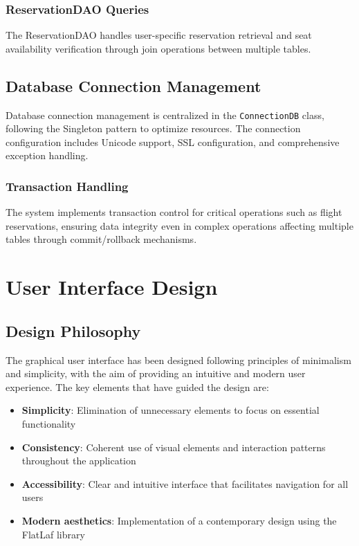 \documentclass[conference]{IEEEtran}
\begin{document}
    \subsubsection{ReservationDAO Queries}
    The ReservationDAO handles user-specific reservation retrieval and seat availability verification through join operations between multiple tables.

    \subsection{Database Connection Management}
    Database connection management is centralized in the \texttt{ConnectionDB} class, following the Singleton pattern to optimize resources. The connection configuration includes Unicode support, SSL configuration, and comprehensive exception handling.

    \subsubsection{Transaction Handling}
    The system implements transaction control for critical operations such as flight reservations, ensuring data integrity even in complex operations affecting multiple tables through commit/rollback mechanisms.


    \section{User Interface Design}

    \subsection{Design Philosophy}
    The graphical user interface has been designed following principles of minimalism and simplicity, with the aim of providing an intuitive and modern user experience. The key elements that have guided the design are:

    \begin{itemize}
        \item \textbf{Simplicity}: Elimination of unnecessary elements to focus on essential functionality
        \item \textbf{Consistency}: Coherent use of visual elements and interaction patterns throughout the application
        \item \textbf{Accessibility}: Clear and intuitive interface that facilitates navigation for all users
        \item \textbf{Modern aesthetics}: Implementation of a contemporary design using the FlatLaf library
    \end{itemize}
\end{document}
